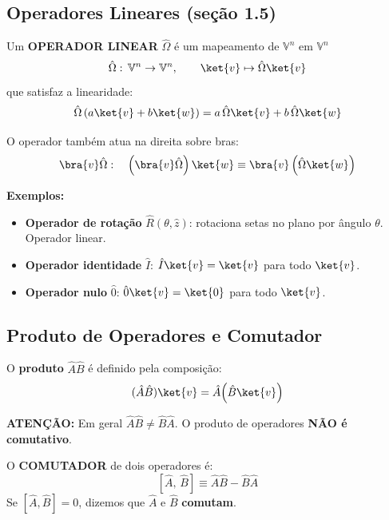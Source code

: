 \subsection*{Operadores Lineares (seção 1.5)}

\begin{shadequote}
    Um \textbf{OPERADOR LINEAR} $\hat{\Omega}$ é um mapeamento de $\mathbb{V}^n$ em $\mathbb{V}^n$
    \[
        \hat{\Omega}:\, \mathbb{V}^n \to \mathbb{V}^n, \qquad \ket{v} \mapsto \hat{\Omega}\ket{v}
    \]
    que satisfaz a linearidade:
    \[
        \hat{\Omega}\left(a\ket{v} + b\ket{w}\right) = a\,\hat{\Omega}\ket{v} + b\,\hat{\Omega}\ket{w}
    \]
\end{shadequote}

O operador também atua na direita sobre bras:
\[
    \bra{v}\hat{\Omega}: \quad \left(\bra{v}\hat{\Omega}\right)\ket{w} \equiv \bra{v}\left(\hat{\Omega}\ket{w}\right)
\]

\textbf{Exemplos:}
\begin{itemize}
    \item \textbf{Operador de rotação} $\hat{R}(\theta, \hat{z})$: rotaciona setas no plano por ângulo $\theta$. Operador linear.
    \item \textbf{Operador identidade} $\hat{I}$: $\hat{I}\ket{v} = \ket{v}$ para todo $\ket{v}$.
    \item \textbf{Operador nulo} $\hat{0}$: $\hat{0}\ket{v} = \ket{0}$ para todo $\ket{v}$.
\end{itemize}

\subsection*{Produto de Operadores e Comutador}

O \textbf{produto} $\hat{A}\hat{B}$ é definido pela composição:
\[
    (\hat{A}\hat{B})\ket{v} = \hat{A}\!\left(\hat{B}\ket{v}\right)
\]

\begin{observacao}[]{}
    \textbf{ATENÇÃO:} Em geral $\hat{A}\hat{B} \neq \hat{B}\hat{A}$. O produto de operadores \textbf{NÃO é comutativo}.
\end{observacao}

\begin{shadequote}
    O \textbf{COMUTADOR} de dois operadores é:
    \begin{equation}
        \left[\hat{A},\, \hat{B}\right] \equiv \hat{A}\hat{B} - \hat{B}\hat{A}
    \end{equation}
    Se $[\hat{A}, \hat{B}] = 0$, dizemos que $\hat{A}$ e $\hat{B}$ \textbf{comutam}.
\end{shadequote}

